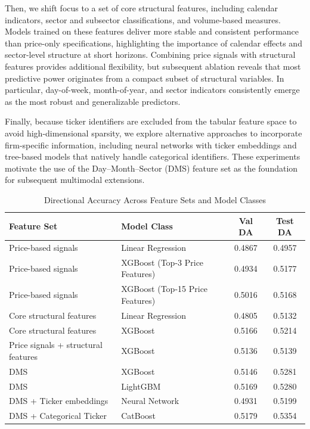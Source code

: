 \documentclass[11pt]{article}
\begin{document}
\vspace{6pt}
\noindent Then, we shift focus to a set of core structural features, including calendar indicators, sector and subsector classifications, and volume-based measures. 
Models trained on these features deliver more stable and consistent performance than price-only specifications, highlighting the importance of calendar effects and sector-level structure at short horizons. Combining price signals with structural features provides additional flexibility, but subsequent ablation reveals that most predictive power originates from a compact subset of structural variables. 
In particular, day-of-week, month-of-year, and sector indicators consistently emerge as the most robust and generalizable predictors.

\vspace{6pt}
\noindent Finally, because ticker identifiers are excluded from the tabular feature space to avoid high-dimensional sparsity, we explore alternative approaches to incorporate firm-specific information, including neural networks with ticker embeddings and tree-based models that natively handle categorical identifiers. 
These experiments motivate the use of the Day--Month--Sector (DMS) feature set as the foundation for subsequent multimodal extensions.

\begin{table}[H]
\centering
\caption{Directional Accuracy Across Feature Sets and Model Classes}
\label{tab:model_progression}
\begin{tabularx}{\textwidth}{X X c c}
\toprule
\textbf{Feature Set} & \textbf{Model Class} & \textbf{Val DA} & \textbf{Test DA} \\
\midrule
Price-based signals 
    & Linear Regression 
    & 0.4867 & 0.4957 \\

Price-based signals 
    & XGBoost (Top-3 Price Features) 
    & 0.4934 & 0.5177 \\

Price-based signals 
    & XGBoost (Top-15 Price Features) 
    & 0.5016 & 0.5168 \\

\midrule
Core structural features 
    & Linear Regression
    & 0.4805 & 0.5132 \\

Core structural features 
    & XGBoost 
    & 0.5166 & 0.5214 \\

Price signals + structural features 
    & XGBoost 
    & 0.5136 & 0.5139 \\

\midrule
DMS 
    & XGBoost
    & 0.5146 & 0.5281 \\

DMS 
    & LightGBM 
    & 0.5169 & 0.5280 \\

DMS + Ticker embeddings
    & Neural Network
    & 0.4931 & 0.5199 \\

DMS + Categorical Ticker
    & CatBoost 
    & 0.5179 & 0.5354 \\
\bottomrule
\end{tabularx}
\end{table}
\end{document}
